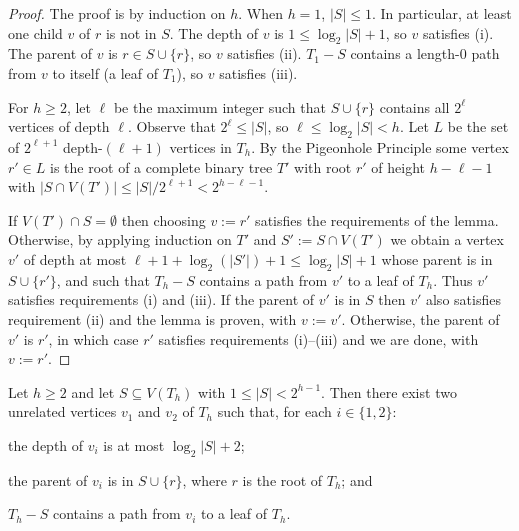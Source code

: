 \documentclass{patmorin}
\renewcommand{\le}{\leqslant}
\renewcommand{\ge}{\geqslant}
\begin{document}
\begin{proof}
  The proof is by induction on $h$.  When $h=1$, $|S|\le 1$. In particular, at least one child $v$ of $r$ is not in $S$.  The depth of $v$ is $1\le \log_2|S|+1$, so $v$ satisfies (i).  The parent of $v$ is $r\in S\cup\{r\}$, so $v$ satisfies (ii).  $T_1-S$ contains a length-$0$ path from $v$ to itself (a leaf of $T_1$), so $v$ satisfies (iii).

  For $h\ge 2$, let $\ell$ be the maximum integer such that $S\cup\{r\}$ contains all $2^\ell$ vertices of depth $\ell$.  Observe that $2^\ell \le |S|$, so $\ell \le \log_2 |S| < h$.  Let $L$ be the set of $2^{\ell+1}$ depth-$(\ell+1)$ vertices in $T_h$.  By the Pigeonhole Principle some vertex $r'\in L$ is the root of a complete binary tree $T'$ with root $r'$ of height $h-\ell-1$ with $|S\cap V(T')| \le |S|/2^{\ell+1} < 2^{h-\ell-1}$.

  If $V(T')\cap S=\emptyset$ then choosing $v:=r'$ satisfies the requirements of the lemma.  Otherwise, by applying induction on $T'$ and $S':=S\cap V(T')$ we obtain a vertex $v'$ of depth at most $\ell+1+\log_2(|S'|)+1 \le \log_2|S|+1$ whose parent is in $S\cup\{r'\}$, and such that $T_h-S$ contains a path from $v'$ to a leaf of $T_h$.  Thus $v'$ satisfies requirements (i) and (iii).  If the parent of $v'$ is in $S$ then $v'$ also satisfies requirement (ii) and the lemma is proven, with $v:=v'$.  Otherwise, the parent of $v'$ is $r'$, in which case $r'$ satisfies requirements (i)--(iii) and we are done, with $v:=r'$.
\end{proof}

\begin{lem}\label{two_paths}
  Let $h\ge 2$
  and let $S\subseteq V(T_h)$ with $1\le |S|< 2^{h-1}$. Then there exist two unrelated vertices $v_1$ and $v_2$ of $T_h$ such that, for each $i\in\{1,2\}$:
  \begin{compactenum}[(i)]
    \item the depth of $v_i$ is at most $\log_2|S|+2$;
    \item the parent of $v_i$ is in $S\cup\{r\}$, where $r$ is the root of $T_h$; and
    \item $T_h-S$ contains a path from $v_i$ to a leaf of $T_h$.
  \end{compactenum}
\end{lem}
\end{document}
